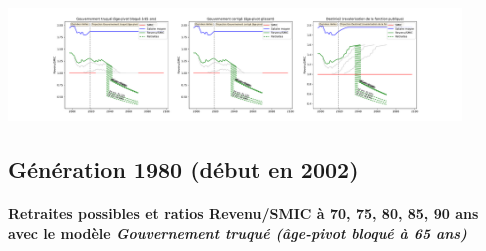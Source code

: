  \begin{center}\includegraphics[width=0.9\textwidth]{fig/ATSEM_1975_22_dest_retraite.pdf}\end{center} \label{fig/ATSEM_1975_22_dest_retraite.pdf} 

\newpage 
 
\subsection{Génération 1980 (début en 2002)} 

\paragraph{Retraites possibles et ratios Revenu/SMIC à 70, 75, 80, 85, 90 ans avec le modèle \emph{Gouvernement truqué (âge-pivot bloqué à 65 ans)}}  
 
